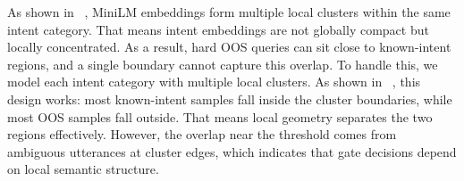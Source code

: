 As shown in ~, MiniLM embeddings form multiple local clusters within the same intent category. That means intent embeddings are not globally compact but locally concentrated. As a result, hard OOS queries can sit close to known-intent regions, and a single boundary cannot capture this overlap. To handle this, we model each intent category with multiple local clusters. As shown in ~, this design works: most known-intent samples fall inside the cluster boundaries, while most OOS samples fall outside. That means local geometry separates the two regions effectively. However, the overlap near the threshold comes from ambiguous utterances at cluster edges, which indicates that gate decisions depend on local semantic structure.
